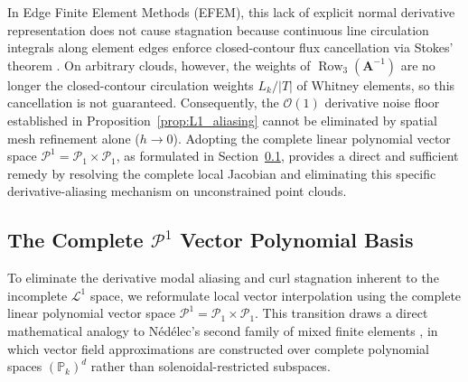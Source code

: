 \documentclass[preprint,12pt]{elsarticle}
\begin{document}
In Edge Finite Element Methods (EFEM), this lack of explicit normal derivative representation does not cause stagnation because continuous line circulation integrals along element edges enforce closed-contour flux cancellation via Stokes' theorem \cite{nedelec1980mixed, monk2003finite}. On arbitrary clouds, however, the weights of $\operatorname{Row}_3(\mathbf{A}^{-1})$ are no longer the closed-contour circulation weights $L_k/|T|$ of Whitney elements, so this cancellation is not guaranteed. Consequently, the $\mathcal{O}(1)$ derivative noise floor established in Proposition~\ref{prop:L1_aliasing} cannot be eliminated by spatial mesh refinement alone ($h \to 0$). Adopting the complete linear polynomial vector space $\mathcal{P}^1 = \mathcal{P}_1 \times \mathcal{P}_1$, as formulated in Section~\ref{subsec:complete_P1_basis}, provides a direct and sufficient remedy by resolving the complete local Jacobian and eliminating this specific derivative-aliasing mechanism on unconstrained point clouds.


\subsection{The Complete \texorpdfstring{$\mathcal{P}^1$}{P1} Vector Polynomial Basis}
\label{subsec:complete_P1_basis}

To eliminate the derivative modal aliasing and curl stagnation inherent to the incomplete $\mathcal{L}^1$ space, we reformulate local vector interpolation using the complete linear polynomial vector space $\mathcal{P}^1 = \mathcal{P}_1 \times \mathcal{P}_1$. This transition draws a direct mathematical analogy to Nédélec's second family of mixed finite elements \cite{nedelec1986new}, in which vector field approximations are constructed over complete polynomial spaces $(\mathbb{P}_k)^d$ rather than solenoidal-restricted subspaces.
\end{document}

